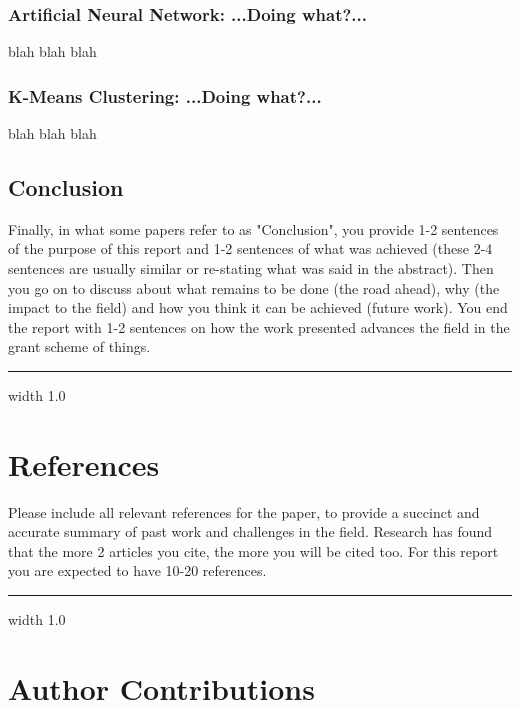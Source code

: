 \documentclass[11pt]{article}
\newcommand{\horizontalLine}{
	\begin{center}
		\hrule width 1.0\textwidth
	\end{center}
}
\begin{document}
\subsubsection{Artificial Neural Network: ...Doing what?...}
\label{subsubsec:ann}
blah blah blah

\subsubsection{K-Means Clustering: ...Doing what?...}
\label{subsubsec:kMeans}
blah blah blah

\subsection{Conclusion}
\label{subsec:conclusion}
Finally, in what some papers refer to as "Conclusion", you provide 1-2 sentences of the purpose
of this report and 1-2 sentences of what was achieved (these 2-4 sentences are usually similar
or re-stating what was said in the abstract). Then you go on to discuss about what remains to
be done (the road ahead), why (the impact to the field) and how you think it can be achieved
(future work). You end the report with 1-2 sentences on how the work presented advances the
field in the grant scheme of things.

\horizontalLine
\section{References}
\label{sec:references}
 Please include all relevant references for the paper, to provide a succinct and accurate
 summary of past work and challenges in the field. Research has found that the more
 2
 articles you cite, the more you will be cited too. For this report you are expected to have 10-20
 references.

\horizontalLine
\section{Author Contributions}
\label{sec:authorContributions}
\end{document}
